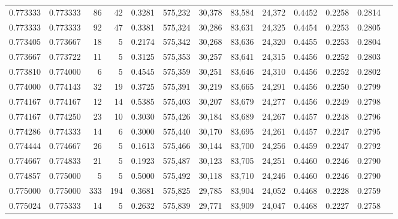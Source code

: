 \begin{tabular}{rrrrrrrrrrrrr}
0.773333 & 0.773333 &    86 &  42 &                                     0.3281 & 575,232 &  30,378 &  83,584 &  24,372 & 0.4452 & 0.2258 & 0.2814 \\
0.773333 & 0.773333 &    92 &  47 &                                     0.3381 & 575,324 &  30,286 &  83,631 &  24,325 & 0.4454 & 0.2253 & 0.2805 \\
0.773405 & 0.773667 &    18 &   5 &                                     0.2174 & 575,342 &  30,268 &  83,636 &  24,320 & 0.4455 & 0.2253 & 0.2804 \\
0.773667 & 0.773722 &    11 &   5 &                                     0.3125 & 575,353 &  30,257 &  83,641 &  24,315 & 0.4456 & 0.2252 & 0.2803 \\
0.773810 & 0.774000 &     6 &   5 &                                     0.4545 & 575,359 &  30,251 &  83,646 &  24,310 & 0.4456 & 0.2252 & 0.2802 \\
0.774000 & 0.774143 &    32 &  19 &                                     0.3725 & 575,391 &  30,219 &  83,665 &  24,291 & 0.4456 & 0.2250 & 0.2799 \\
0.774167 & 0.774167 &    12 &  14 &                                     0.5385 & 575,403 &  30,207 &  83,679 &  24,277 & 0.4456 & 0.2249 & 0.2798 \\
0.774167 & 0.774250 &    23 &  10 &                                     0.3030 & 575,426 &  30,184 &  83,689 &  24,267 & 0.4457 & 0.2248 & 0.2796 \\
0.774286 & 0.774333 &    14 &   6 &                                     0.3000 & 575,440 &  30,170 &  83,695 &  24,261 & 0.4457 & 0.2247 & 0.2795 \\
0.774444 & 0.774667 &    26 &   5 &                                     0.1613 & 575,466 &  30,144 &  83,700 &  24,256 & 0.4459 & 0.2247 & 0.2792 \\
0.774667 & 0.774833 &    21 &   5 &                                     0.1923 & 575,487 &  30,123 &  83,705 &  24,251 & 0.4460 & 0.2246 & 0.2790 \\
0.774857 & 0.775000 &     5 &   5 &                                     0.5000 & 575,492 &  30,118 &  83,710 &  24,246 & 0.4460 & 0.2246 & 0.2790 \\
0.775000 & 0.775000 &   333 & 194 &                                     0.3681 & 575,825 &  29,785 &  83,904 &  24,052 & 0.4468 & 0.2228 & 0.2759 \\
0.775024 & 0.775333 &    14 &   5 &                                     0.2632 & 575,839 &  29,771 &  83,909 &  24,047 & 0.4468 & 0.2227 & 0.2758 \\

\end{tabular}
